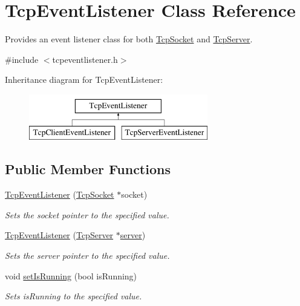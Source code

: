\hypertarget{class_tcp_event_listener}{}\section{Tcp\+Event\+Listener Class Reference}
\label{class_tcp_event_listener}


Provides an event listener class for both \mbox{\hyperlink{class_tcp_socket}{Tcp\+Socket}} and \mbox{\hyperlink{class_tcp_server}{Tcp\+Server}}.  




{\ttfamily \#include $<$tcpeventlistener.\+h$>$}

Inheritance diagram for Tcp\+Event\+Listener\+:\begin{figure}[H]
\begin{center}
\leavevmode
\includegraphics[height=2.000000cm]{class_tcp_event_listener}
\end{center}
\end{figure}
\subsection*{Public Member Functions}
\begin{DoxyCompactItemize}
\item 
\mbox{\hyperlink{class_tcp_event_listener_a3d6f7243d828830ed9373a2e488c95b6}{Tcp\+Event\+Listener}} (\mbox{\hyperlink{class_tcp_socket}{Tcp\+Socket}} $\ast$socket)
\begin{DoxyCompactList}\small\item\em Sets the socket pointer to the specified value. \end{DoxyCompactList}\item 
\mbox{\hyperlink{class_tcp_event_listener_aba0cb36a5016a7c081b277ff4030fbf6}{Tcp\+Event\+Listener}} (\mbox{\hyperlink{class_tcp_server}{Tcp\+Server}} $\ast$\mbox{\hyperlink{class_tcp_event_listener_aa0a66ee360e15e349eda1c10041c3219}{server}})
\begin{DoxyCompactList}\small\item\em Sets the server pointer to the specified value. \end{DoxyCompactList}\item 
void \mbox{\hyperlink{class_tcp_event_listener_aac35550b2da7ba7b4f27e8dd169a436b}{set\+Is\+Running}} (bool is\+Running)
\begin{DoxyCompactList}\small\item\em Sets is\+Running to the specified value. \end{DoxyCompactList}\end{DoxyCompactItemize}
